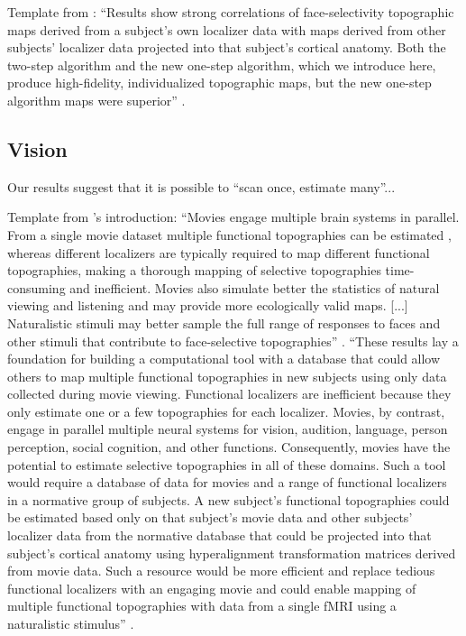 
%
Template from \citet{jiahui2020predicting}: ``Results show strong correlations
of face-selectivity topographic maps derived from a subject's own localizer data
with maps derived from other subjects' localizer data projected into that
subject's cortical anatomy. Both the two-step algorithm and the new one-step
algorithm, which we introduce here, produce high-fidelity, individualized
topographic maps, but the new one-step algorithm maps were superior''
\citep{jiahui2020predicting}.


\subsection{Vision}



Our results suggest that it is possible to ``scan once, estimate many''...

%
Template from \citet{jiahui2020predicting}'s introduction: ``Movies engage
multiple brain systems in parallel. From a single movie dataset multiple
functional topographies can be estimated \citep{guntupalli2016model}, whereas
different localizers are typically required to map different functional
topographies, making a thorough mapping of selective topographies time-consuming
and inefficient. Movies also simulate better the statistics of natural viewing
and listening and may provide more ecologically valid maps. [...] Naturalistic
stimuli may better sample the full range of responses to faces and other stimuli
that contribute to face-selective topographies'' \citep{jiahui2020predicting}.
%
``These results lay a foundation for building a computational tool with a
database that could allow others to map multiple functional topographies in new
subjects using only data collected during movie viewing. Functional localizers
are inefficient because they only estimate one or a few topographies for each
localizer. Movies, by contrast, engage in parallel multiple neural systems for
vision, audition, language, person perception, social cognition, and other
functions. Consequently, movies have the potential to estimate selective
topographies in all of these domains. Such a tool would require a database of
data for movies and a range of functional localizers in a normative group of
subjects. A new subject's functional topographies could be estimated based only
on that subject's movie data and other subjects' localizer data from the
normative database that could be projected into that subject's cortical anatomy
using hyperalignment transformation matrices derived from movie data. Such a
resource would be more efficient and replace tedious functional localizers with
an engaging movie and could enable mapping of multiple functional topographies
with data from a single fMRI using a naturalistic stimulus''
\citet{jiahui2020predicting}.



